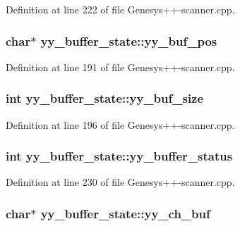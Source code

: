 Definition at line 222 of file Genesys++-\/scanner.\-cpp.

\hypertarget{structyy__buffer__state_a58aa927f098b99d99e75da80f9b681ef}{
\subsubsection[{yy\-\_\-buf\-\_\-pos}]{\setlength{\rightskip}{0pt plus 5cm}char$\ast$ yy\-\_\-buffer\-\_\-state\-::yy\-\_\-buf\-\_\-pos}}\label{structyy__buffer__state_a58aa927f098b99d99e75da80f9b681ef}


Definition at line 191 of file Genesys++-\/scanner.\-cpp.

\hypertarget{structyy__buffer__state_a451d39697f006f3922c1f43cf79286b4}{
\subsubsection[{yy\-\_\-buf\-\_\-size}]{\setlength{\rightskip}{0pt plus 5cm}int yy\-\_\-buffer\-\_\-state\-::yy\-\_\-buf\-\_\-size}}\label{structyy__buffer__state_a451d39697f006f3922c1f43cf79286b4}


Definition at line 196 of file Genesys++-\/scanner.\-cpp.

\hypertarget{structyy__buffer__state_a70fd925d37a2f0454fbd0def675d106c}{
\subsubsection[{yy\-\_\-buffer\-\_\-status}]{\setlength{\rightskip}{0pt plus 5cm}int yy\-\_\-buffer\-\_\-state\-::yy\-\_\-buffer\-\_\-status}}\label{structyy__buffer__state_a70fd925d37a2f0454fbd0def675d106c}


Definition at line 230 of file Genesys++-\/scanner.\-cpp.

\hypertarget{structyy__buffer__state_ad7b8df8d8a4688e57b0b8d3ca75adc85}{
\subsubsection[{yy\-\_\-ch\-\_\-buf}]{\setlength{\rightskip}{0pt plus 5cm}char$\ast$ yy\-\_\-buffer\-\_\-state\-::yy\-\_\-ch\-\_\-buf}}\label{structyy__buffer__state_ad7b8df8d8a4688e57b0b8d3ca75adc85}


